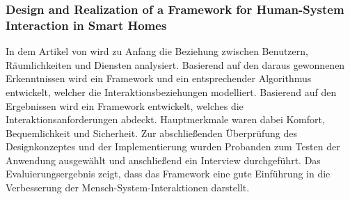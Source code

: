         \subsubsection*{Design and Realization of a Framework for Human-System Interaction in Smart Homes}
            In dem Artikel von \cite{Wu2012} wird zu Anfang die Beziehung zwischen Benutzern, Räumlichkeiten und 
            Diensten analysiert. Basierend auf den daraus gewonnenen Erkenntnissen wird ein Framework und ein 
            entsprechender Algorithmus entwickelt, welcher die Interaktionsbeziehungen modelliert. Basierend auf den  
            Ergebnissen wird ein Framework entwickelt, welches die Interaktionsanforderungen abdeckt. Hauptmerkmale 
            waren dabei Komfort, Bequemlichkeit und Sicherheit. Zur abschließenden Überprüfung des Designkonzeptes und 
            der Implementierung wurden Probanden zum Testen der Anwendung ausgewählt und anschließend ein Interview 
            durchgeführt. Das Evaluierungsergebnis zeigt, dass das Framework eine gute Einführung in die Verbesserung 
            der Mensch-System-Interaktionen darstellt. 

